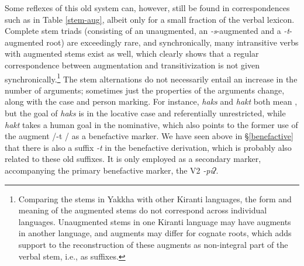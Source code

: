 Some reflexes of this old system can, however, still be found in correspondences such as in Table \ref{stem-aug}, albeit only for a small fraction of the verbal lexicon. Complete stem triads (consisting of an unaugmented, an \emph{-s}-augmented and a \emph{-t}-augmented root) are exceedingly rare, and synchronically, many intransitive verbs with augmented stems exist as well, which clearly shows that a regular correspondence between augmentation and transitivization is not given synchronically.\footnote{Comparing the stems in Yakkha with other Kiranti languages, the form and meaning of the augmented stems do not correspond across individual languages. Unaugmented stems in one Kiranti language may have augments in another language, and augments may differ for cognate roots, which adds support to the reconstruction of these augments as non-integral part of the verbal stem, i.e., as suffixes.} The stem alternations do not necessarily entail an increase in the number of arguments; sometimes just the properties of the arguments change, along with the case and person marking. For instance, \emph{haks} and \emph{hakt} both mean , but the goal of \emph{haks} is in the locative case and referentially unrestricted, while \emph{hakt} takes a human goal in the nominative, which also points to the former use of the augment /-t / as a benefactive marker. We have seen above in §\ref{benefactive} that there is also a suffix \emph{-t}  in the benefactive derivation, which is probably also related to these old suffixes. It is only employed as a secondary marker, accompanying the primary benefactive marker, the V2 \emph{-piʔ}. 


